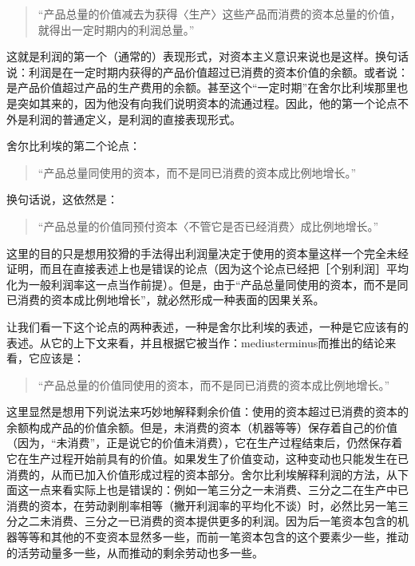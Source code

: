 \begin{quote}{“产品总量的价值减去为获得〈生产〉这些产品而消费的资本总量的价值，就得出一定时期内的利润总量。”}\end{quote}

这就是利润的第一个（通常的）表现形式，对资本主义意识来说也是这样。换句话说：利润是在一定时期内获得的产品价值超过已消费的资本价值的余额。或者说：是产品价值超过产品的生产费用的余额。甚至这个“一定时期”在舍尔比利埃那里也是突如其来的，因为他没有向我们说明资本的流通过程。因此，他的第一个论点不外是利润的普通定义，是利润的直接表现形式。

舍尔比利埃的第二个论点：

\begin{quote}{“产品总量同使用的资本，而不是同已消费的资本成比例地增长。”}\end{quote}

换句话说，这依然是：

\begin{quote}{“产品总量的价值同预付资本〈不管它是否已经消费〉成比例地增长。”}\end{quote}

这里的目的只是想用狡猾的手法得出利润量决定于使用的资本量这样一个完全未经证明，而且在直接表述上也是错误的论点（因为这个论点已经把［个别利润］平均化为一般利润率这一点当作前提）。但是，由于“产品总量同使用的资本，而不是同已消费的资本成比例地增长”，就必然形成一种表面的因果关系。

让我们看一下这个论点的两种表述，一种是舍尔比利埃的表述，一种是它应该有的表述。从它的上下文来看，并且根据它被当作：mediusterminus而推出的结论来看，它应该是：

\begin{quote}{“产品总量的价值同使用的资本，而不是同已消费的资本成比例地增长。”}\end{quote}

这里显然是想用下列说法来巧妙地解释剩余价值：使用的资本超过已消费的资本的余额构成产品的价值余额。但是，未消费的资本（机器等等）保存着自己的价值（因为，“未消费”，正是说它的价值未消费），它在生产过程结束后，仍然保存着它在生产过程开始前具有的价值。如果发生了价值变动，这种变动也只能发生在已消费的，从而已加入价值形成过程的资本部分。舍尔比利埃解释利润的方法，从下面这一点来看实际上也是错误的：例如一笔三分之一未消费、三分之二在生产中已消费的资本，在劳动剥削率相等（撇开利润率的平均化不谈）时，必然比另一笔三分之二未消费、三分之一已消费的资本提供更多的利润。因为后一笔资本包含的机器等等和其他的不变资本显然多一些，而前一笔资本包含的这个要素少一些，推动的活劳动量多一些，从而推动的剩余劳动也多一些。

